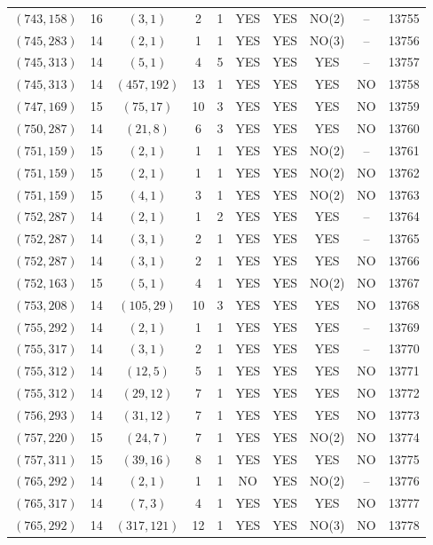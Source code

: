 \begin{longtable}{|c|c|c|c|c|c|c|c|c|c|}
$(743, 158)$ & 16 & $(3, 1)$ & 2 & 1 & YES & YES & NO(2) & -- & 13755\\
$(745, 283)$ & 14 & $(2, 1)$ & 1 & 1 & YES & YES & NO(3) & -- & 13756\\
$(745, 313)$ & 14 & $(5, 1)$ & 4 & 5 & YES & YES & YES & -- & 13757\\
$(745, 313)$ & 14 & $(457, 192)$ & 13 & 1 & YES & YES & YES & NO & 13758\\
$(747, 169)$ & 15 & $(75, 17)$ & 10 & 3 & YES & YES & YES & NO & 13759\\
$(750, 287)$ & 14 & $(21, 8)$ & 6 & 3 & YES & YES & YES & NO & 13760\\
$(751, 159)$ & 15 & $(2, 1)$ & 1 & 1 & YES & YES & NO(2) & -- & 13761\\
$(751, 159)$ & 15 & $(2, 1)$ & 1 & 1 & YES & YES & NO(2) & NO & 13762\\
$(751, 159)$ & 15 & $(4, 1)$ & 3 & 1 & YES & YES & NO(2) & NO & 13763\\
$(752, 287)$ & 14 & $(2, 1)$ & 1 & 2 & YES & YES & YES & -- & 13764\\
$(752, 287)$ & 14 & $(3, 1)$ & 2 & 1 & YES & YES & YES & -- & 13765\\
$(752, 287)$ & 14 & $(3, 1)$ & 2 & 1 & YES & YES & YES & NO & 13766\\
$(752, 163)$ & 15 & $(5, 1)$ & 4 & 1 & YES & YES & NO(2) & NO & 13767\\
$(753, 208)$ & 14 & $(105, 29)$ & 10 & 3 & YES & YES & YES & NO & 13768\\
$(755, 292)$ & 14 & $(2, 1)$ & 1 & 1 & YES & YES & YES & -- & 13769\\
$(755, 317)$ & 14 & $(3, 1)$ & 2 & 1 & YES & YES & YES & -- & 13770\\
$(755, 312)$ & 14 & $(12, 5)$ & 5 & 1 & YES & YES & YES & NO & 13771\\
$(755, 312)$ & 14 & $(29, 12)$ & 7 & 1 & YES & YES & YES & NO & 13772\\
$(756, 293)$ & 14 & $(31, 12)$ & 7 & 1 & YES & YES & YES & NO & 13773\\
$(757, 220)$ & 15 & $(24, 7)$ & 7 & 1 & YES & YES & NO(2) & NO & 13774\\
$(757, 311)$ & 15 & $(39, 16)$ & 8 & 1 & YES & YES & YES & NO & 13775\\
$(765, 292)$ & 14 & $(2, 1)$ & 1 & 1 & NO & YES & NO(2) & -- & 13776\\
$(765, 317)$ & 14 & $(7, 3)$ & 4 & 1 & YES & YES & YES & NO & 13777\\
$(765, 292)$ & 14 & $(317, 121)$ & 12 & 1 & YES & YES & NO(3) & NO & 13778\\

\end{longtable}
